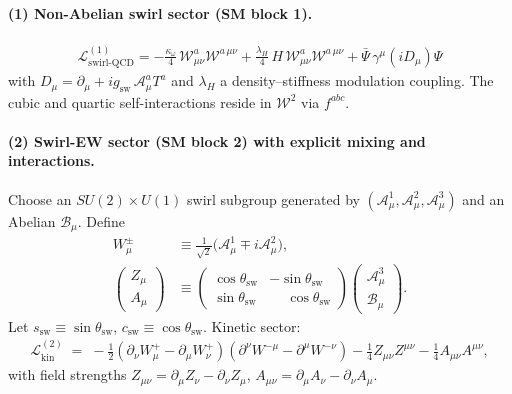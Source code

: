 \documentclass[11pt]{article}
\begin{document}
    \paragraph{(1) Non-Abelian swirl sector (SM block 1).}
    \begin{align}
        \boxed{
            \mathcal{L}^{(1)}_{\text{swirl-QCD}}
            = -\frac{\kappa_\omega}{4}\,\mathcal{W}^a_{\mu\nu}\mathcal{W}^{a\,\mu\nu}
            +\frac{\lambda_H}{4}\,H\,\mathcal{W}^a_{\mu\nu}\mathcal{W}^{a\,\mu\nu}
            +\bar{\Psi}\,\gamma^\mu(iD_\mu)\Psi
        }
    \end{align}
    with \(D_\mu=\partial_\mu+i g_\text{sw}\,\mathcal{A}_\mu^a T^a\) and \(\lambda_H\) a density–stiffness modulation coupling.
    The cubic and quartic self-interactions reside in \(\mathcal{W}^2\) via \(f^{abc}\).

    \paragraph{(2) Swirl-EW sector (SM block 2) with explicit mixing and interactions.}
    Choose an $SU(2)\times U(1)$ swirl subgroup generated by $(\mathcal{A}_\mu^1,\mathcal{A}_\mu^2,\mathcal{A}_\mu^3)$ and an Abelian \(\mathcal{B}_\mu\).
    Define
    \begin{align}
        W^\pm_\mu &\equiv \frac{1}{\sqrt{2}}\big(\mathcal{A}_\mu^1 \mp i \mathcal{A}_\mu^2\big),\\
        \begin{pmatrix} Z_\mu \\ A_\mu \end{pmatrix}
        &\equiv
        \begin{pmatrix}
            \cos\theta_\text{sw} & -\sin\theta_\text{sw}\\
            \sin\theta_\text{sw} & \phantom{-}\cos\theta_\text{sw}
        \end{pmatrix}
        \begin{pmatrix}
            \mathcal{A}_\mu^3 \\ \mathcal{B}_\mu
        \end{pmatrix}.
    \end{align}
    Let $s_\text{sw}\equiv \sin\theta_\text{sw}$, $c_\text{sw}\equiv \cos\theta_\text{sw}$.
    Kinetic sector:
    \begin{align}
        \mathcal{L}^{(2)}_{\text{kin}} \;=\;
        -\frac{1}{2}(\partial_\nu W_\mu^+ - \partial_\mu W_\nu^+)(\partial^\nu W^{-\mu}-\partial^\mu W^{-\nu})
        -\frac{1}{4}Z_{\mu\nu}Z^{\mu\nu}
        -\frac{1}{4}A_{\mu\nu}A^{\mu\nu},
    \end{align}
    with field strengths $Z_{\mu\nu}=\partial_\mu Z_\nu-\partial_\nu Z_\mu$, $A_{\mu\nu}=\partial_\mu A_\nu-\partial_\nu A_\mu$.
\end{document}
